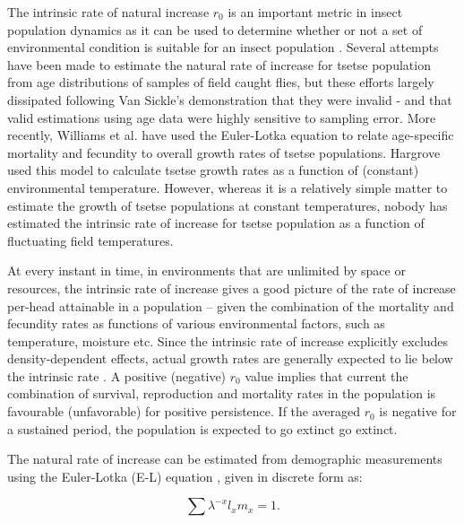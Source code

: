 \documentclass[12pt,a4paper]{article}
\newcommand{\comment}[3]{\textcolor{#1}{\textbf{[#2: }\textsl{#3}\textbf{]}}}
\newcommand{\jd}[1]{\comment{cyan}{JD}{#1}}
\begin{document}
The intrinsic rate of natural increase $r_0$ is an important metric in insect population dynamics as it can be used to determine whether or not a set of environmental condition is suitable for an insect population \cite{Birch1948}. Several attempts have been made to estimate the natural rate of increase for tsetse population from age distributions of samples of field caught flies, but these efforts largely dissipated following Van Sickle’s \cite{VanSickle1988a} demonstration that they were invalid - and that valid estimations using age data were highly sensitive to sampling error. More recently, Williams et al. \cite{williams1990tsetse} have used the Euler-Lotka equation to relate age-specific mortality and fecundity to overall growth rates of tsetse populations. Hargrove \cite{Hargrove2004a}  used this model to calculate tsetse growth rates as a function of (constant) environmental temperature. However, whereas it is a relatively simple matter to estimate the growth of tsetse populations at constant temperatures, nobody has estimated the intrinsic rate of increase for tsetse population as a function of fluctuating field temperatures.

At every instant in time, in environments that are unlimited by space or  resources, the intrinsic rate of increase gives a good picture of the rate of increase per-head  attainable in a population -- given the combination of  the mortality and fecundity rates as functions of various environmental factors, such as temperature, moisture etc. Since the intrinsic rate of increase explicitly excludes density-dependent effects, actual growth rates are generally expected to lie below the intrinsic rate \cite{Birch1948}. A positive (negative) $r_0$ value implies that current the combination of survival, reproduction and  mortality rates in the population is favourable (unfavorable) for positive persistence. If the averaged $r_0$ is negative for a sustained period, the population is expected to go extinct go extinct.

The natural rate of increase can be estimated from demographic measurements using the Euler-Lotka (E-L) equation \cite{Birch1948,Zidon2015}, given in discrete form as:

\begin{equation}
\label{eulerLotkaEq}
\sum \lambda^{-x}l_{x}m_{x} = 1.
\end{equation}
\end{document}
